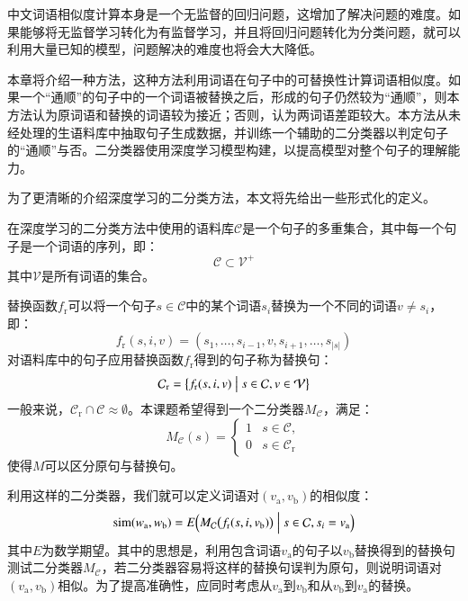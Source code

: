 
\label{c:classifer}
中文词语相似度计算本身是一个无监督的回归问题，这增加了解决问题的难度。如果能够将无监督学习转化为有监督学习，并且将回归问题转化为分类问题，就可以利用大量已知的模型，问题解决的难度也将会大大降低。

本章将介绍一种方法，这种方法利用词语在句子中的可替换性计算词语相似度。如果一个“通顺”的句子中的一个词语被替换之后，形成的句子仍然较为“通顺”，则本方法认为原词语和替换的词语较为接近；否则，认为两词语差距较大。本方法从未经处理的生语料库中抽取句子生成数据，并训练一个辅助的二分类器以判定句子的“通顺”与否。二分类器使用深度学习模型构建，以提高模型对整个句子的理解能力。

\label{s:classifer pricinple}
为了更清晰的介绍深度学习的二分类方法，本文将先给出一些形式化的定义。

在深度学习的二分类方法中使用的语料库$\mathcal{C}$是一个句子的多重集合，其中每一个句子是一个词语的序列，即：
\begin{equation}
\mathcal{C} \subset \mathcal{V}^+
\label{e:corpus}
\end{equation}
其中$\mathcal{V}$是所有词语的集合。

替换函数$f_\text{r}$可以将一个句子$s \in \mathcal{C}$中的某个词语$s_i$替换为一个不同的词语$v \ne s_i$，即：
\begin{equation}
f_\text{r}(s, i, v) = (s_1, \dots, s_{i - 1}, v, s_{i + 1}, \dots, s_{|s|})
\end{equation}
对语料库中的句子应用替换函数$f_\text{r}$得到的句子称为替换句：
\begin{equation}
\mathcal{C}_\text{r} = \bigl\{f_\text{r}(s, i, v) \bigm| s \in \mathcal{C}, v \in \mathcal{V}\bigr\}
\end{equation}
一般来说，$\mathcal{C}_\text{r} \cap \mathcal{C} \approx \emptyset$。本课题希望得到一个二分类器$M_\mathcal{C}$，满足：
\begin{equation}
M_\mathcal{C}(s) = 
\begin{cases}
1 & s \in \mathcal{C}, \\
0 & s \in \mathcal{C}_\text{r}
\end{cases}
\end{equation}
使得$M$可以区分原句与替换句。

利用这样的二分类器，我们就可以定义词语对$(v_\text{a}, v_\text{b})$的相似度：
\begin{equation}
\operatorname{sim}(w_\text{a}, w_\text{b}) = E\Bigl(M_\mathcal{C}\bigl(f_\text{r}(s, i, v_\text{b})\bigr) \Bigm| s \in \mathcal{C}, s_i = v_\text{a}\Bigr)
\label{e:avg}
\end{equation}
其中$E$为数学期望。其中的思想是，利用包含词语$v_\text{a}$的句子以$v_\text{b}$替换得到的替换句测试二分类器$M_\mathcal{C}$，若二分类器容易将这样的替换句误判为原句，则说明词语对$(v_\text{a}, v_\text{b})$相似。为了提高准确性，应同时考虑从$v_\text{a}$到$v_\text{b}$和从$v_\text{b}$到$v_\text{a}$的替换。

